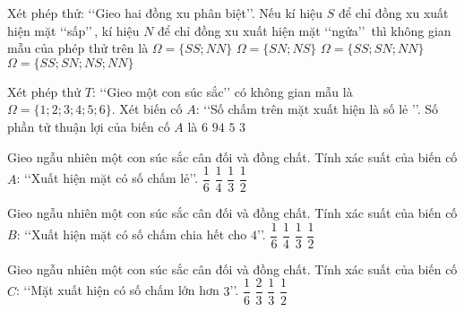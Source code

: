 \begin{ex}%
	Xét phép thử: \lq\lq Gieo hai đồng xu phân biệt\rq\rq. Nếu kí hiệu $S$ để chỉ đồng xu xuất hiện mặt \lq\lq sấp\rq\rq \,, kí hiệu $N$
	để chỉ đồng xu xuất hiện mặt \lq\lq ngửa\rq\rq \, thì không gian mẫu của phép thử trên là
	\choice
	{$\Omega=\{SS;NN\}$}
	{ $\Omega=\{SN;NS\}$}
	{$\Omega=\{SS;SN;NN\}$}
	{\True $\Omega=\{SS;SN;NS;NN\}$}	
\end{ex}
\begin{ex}%
	Xét phép thử $T$: \lq\lq Gieo một con súc sắc\rq\rq\; có không gian mẫu là $\Omega=\{1 ; 2 ; 3 ; 4 ; 5 ; 6\}$. Xét biến cố $A$: \lq\lq Số chấm trên mặt xuất hiện là số lẻ \rq\rq.	Số phần tử thuận lợi của biến cố $A$ là
	\choice
	{$6$}
	{ $94$}
	{$5$}
	{\True $3$}	
\end{ex}
\begin{ex}%
	Gieo ngẫu nhiên một con súc sắc cân đối và đồng chất. Tính xác suất của biến cố $A$: \lq\lq Xuất hiện mặt có số chấm lẻ\rq\rq.
	\choice
	{$\dfrac{1}{6}$}
	{ $\dfrac{1}{4}$}
	{$\dfrac{1}{3}$}
	{\True $\dfrac{1}{2}$}	
\end{ex}
\begin{ex}%
	Gieo ngẫu nhiên một con súc sắc cân đối và đồng chất. Tính xác suất của biến cố $B$: \lq\lq Xuất hiện mặt có số chấm chia hết cho $4$\rq\rq.
	\choice
	{\True$\dfrac{1}{6}$}
	{ $\dfrac{1}{4}$}
	{$\dfrac{1}{3}$}
	{ $\dfrac{1}{2}$}	
\end{ex}
\begin{ex}%
	Gieo ngẫu nhiên một con súc sắc cân đối và đồng chất. Tính xác suất của biến cố $C$:  \lq\lq Mặt xuất hiện có số chấm lớn hơn $3$\rq\rq.
	\choice
	{$\dfrac{1}{6}$}
	{ $\dfrac{2}{3}$}
	{$\dfrac{1}{3}$}
	{\True  $\dfrac{1}{2}$}	
\end{ex}


